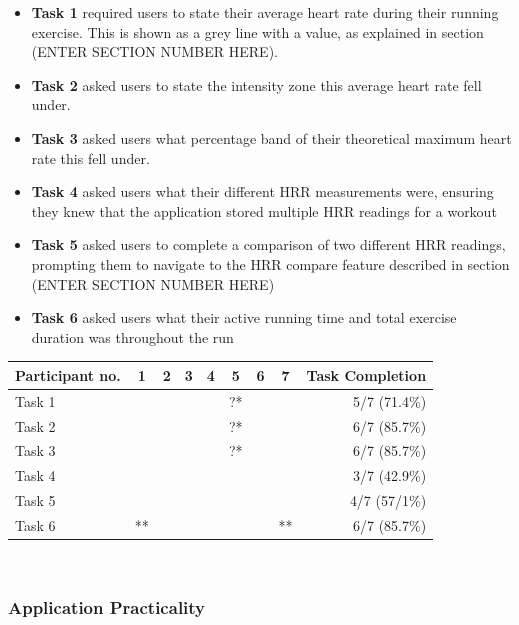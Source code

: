 \documentclass{l4proj}
\newcommand{\cmark}{\ding{51}}
\newcommand{\xmark}{\ding{55}}
\begin{document}
\begin{itemize}
    \item \textbf{Task 1} required users to state their average heart rate during their running exercise. This is shown as a grey line with a value, as explained in section (ENTER SECTION NUMBER HERE).
    \item \textbf{Task 2} asked users to state the intensity zone this average heart rate fell under.
    \item \textbf{Task 3} asked users what percentage band of their theoretical maximum heart rate this fell under.
    \item \textbf{Task 4} asked users what their different HRR measurements were, ensuring they knew that the application stored multiple HRR readings for a workout
    \item \textbf{Task 5} asked users to complete a comparison of two different HRR readings, prompting them to navigate to the HRR compare feature described in section (ENTER SECTION NUMBER HERE)
    \item \textbf{Task 6} asked users what their active running time and total exercise duration was throughout the run
\end{itemize}

\begin{table}[h!]
    \centering
    \begin{tabular}{l|ccccccc|r}
        \hline  
        Participant no. & 1 & 2 & 3 & 4 & 5 & 6 & 7 & Task Completion \\
        \hline
        Task 1 & \cmark & \cmark & \cmark & \xmark & ?* & \cmark & \cmark & 5/7 (71.4\%)\\
        Task 2 & \cmark & \cmark & \cmark & \cmark & ?* & \cmark & \cmark & 6/7 (85.7\%)\\
        Task 3 & \cmark & \cmark & \cmark & \cmark & ?* & \cmark & \xmark & 6/7 (85.7\%)\\
        Task 4 & \xmark & \cmark & \xmark & \xmark & \cmark & \cmark & \xmark & 3/7 (42.9\%)\\
        Task 5 & \xmark & \cmark & \xmark & \cmark & \cmark & \cmark & \xmark & 4/7 (57/1\%)\\
        Task 6 & \cmark** & \cmark & \cmark & \cmark & \cmark & \cmark & \cmark** & 6/7 (85.7\%)    
        \hline
    \end{tabular}
\end{table}

\noindent\mbox{}\\
\subsubsection{Application Practicality}
\noindent\mbox{}\\
\end{document}
